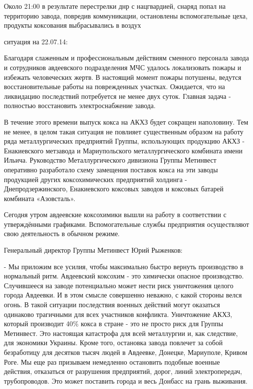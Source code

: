  
 
 
 
 

\begin{multicols}{2}

Около 21:00 в результате перестрелки днр с нацгвардией, снаряд попал на
территорию завода, повредив коммуникации, остановлены вспомогательные цеха,
продукты коксования выбрасывались в воздух

ситуация на 22.07.14: 

Благодаря слаженным и профессиональным действиям сменного персонала завода и
сотрудников авдеевского подразделения МЧС удалось локализовать пожары и
избежать человеческих жертв. В настоящий момент пожары потушены, ведутся
восстановительные работы на поврежденных участках. Ожидается, что на ликвидацию
последствий потребуется не менее двух суток. Главная задача - полностью
восстановить электроснабжение завода.

В течение этого времени выпуск кокса на АКХЗ будет сокращен наполовину. Тем не
менее, в целом такая ситуация не повлияет существенным образом на работу ряда
металлургических предприятий Группы, использующих продукцию АКХЗ -
Енакиевского метзавода и Мариупольского металлургического комбината имени
Ильича. Руководство Металлургического дивизиона Группы Метинвест оперативно
разработало схему замещения поставок кокса на эти заводы продукцией других
коксохимических предприятий холдинга - Днепродзержинского, Енакиевского
коксовых заводов и коксовых батарей комбината «Азовсталь».

Сегодня утром авдеевские коксохимики вышли на работу в соответствии с
утверждёнными графиками. Вспомогательные службы предприятия осуществляют свою
деятельность в обычном режиме.

Генеральный директор Группы Метинвест Юрий Рыженков:

- Мы приложим все усилия, чтобы максимально быстро вернуть производство в
нормальный ритм. Авдеевский коксохим - это химически опасное производство.
Случившееся на заводе потенциально может нести риск уничтожения целого города
Авдеевки. И в этом смысле совершенно неважно, с какой стороны велся огонь. В
такой ситуации последствия военных действий могут оказаться одинаково
трагичными для всех участников конфликта. Уничтожение АКХЗ, который производит
40\% кокса в стране - это не просто риск для Группы Метинвест. Это настоящая
катастрофа для всей металлургии и, как следствие, для экономики Украины. Кроме
того, остановка завода повлечет за собой безработицу для десятков тысяч людей в
Авдеевке, Донецке, Мариуполе, Кривом Роге. Мы еще раз призываем немедленно
остановить подобные военные действия, отказаться от разрушения предприятий,
дорог, линий электропередач, трубопроводов. Это может поставить города и весь
Донбасс на грань выживания.

\end{multicols}

